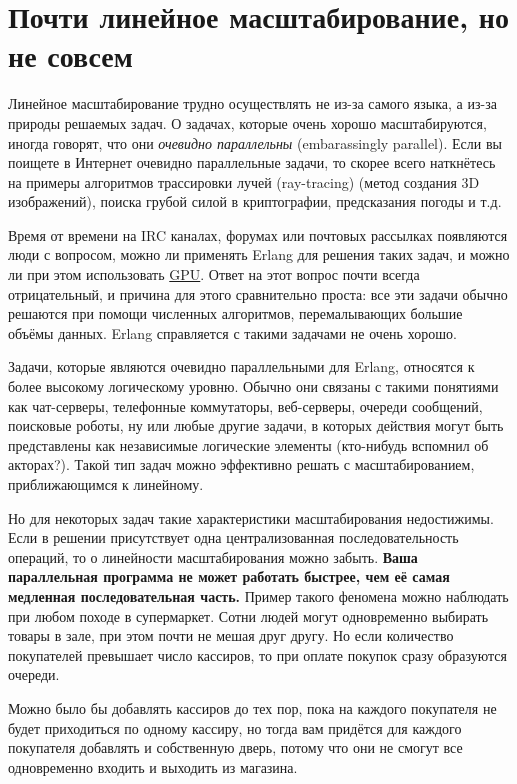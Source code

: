 \section{Почти линейное масштабирование, но не совсем}
\label{not-entirely-unlike-linear-scaling}
Линейное масштабирование трудно осуществлять не из\--за самого языка, а из\--за природы решаемых задач.
О задачах, которые очень хорошо масштабируются, иногда говорят, что они \emph{очевидно  параллельны} (embarassingly parallel).
Если вы поищете в Интернет очевидно параллельные задачи, то скорее всего наткнётесь на примеры алгоритмов трассировки лучей (ray\--tracing) (метод создания 3D изображений), поиска грубой силой в криптографии, предсказания погоды и т.д.

Время от времени на IRC каналах, форумах или почтовых рассылках появляются люди с вопросом, можно ли применять Erlang для решения таких задач, и можно ли при этом использовать \href{http://en.wikipedia.org/wiki/Graphics_Processing_Unit}{GPU}.
Ответ на этот вопрос почти всегда отрицательный, и причина для этого сравнительно проста: все эти задачи обычно решаются при помощи численных алгоритмов, перемалывающих большие объёмы данных.
Erlang справляется с такими задачами не очень хорошо.

Задачи, которые являются очевидно параллельными для Erlang, относятся к более высокому логическому уровню.
Обычно они связаны с такими понятиями как чат\--серверы, телефонные коммутаторы, веб\--серверы, очереди сообщений, поисковые роботы, ну или любые другие задачи, в которых действия могут быть представлены как независимые логические элементы (кто\--нибудь вспомнил об акторах?).
Такой тип задач можно эффективно решать с масштабированием, приближающимся к линейному.

Но для некоторых задач такие характеристики масштабирования недостижимы.
Если в решении присутствует одна централизованная последовательность операций, то о линейности масштабирования можно забыть.
\textbf{Ваша параллельная программа не может работать быстрее, чем её самая медленная последовательная часть.}
Пример такого феномена можно наблюдать при любом походе в супермаркет.
Сотни людей могут одновременно выбирать товары в зале, при этом почти не мешая друг другу.
Но если количество покупателей превышает число кассиров, то при оплате покупок сразу образуются очереди.

Можно было бы добавлять кассиров до тех пор, пока на каждого покупателя не будет приходиться по одному кассиру, но тогда вам придётся для каждого покупателя добавлять и собственную дверь, потому что они не смогут все одновременно входить и выходить из магазина.


